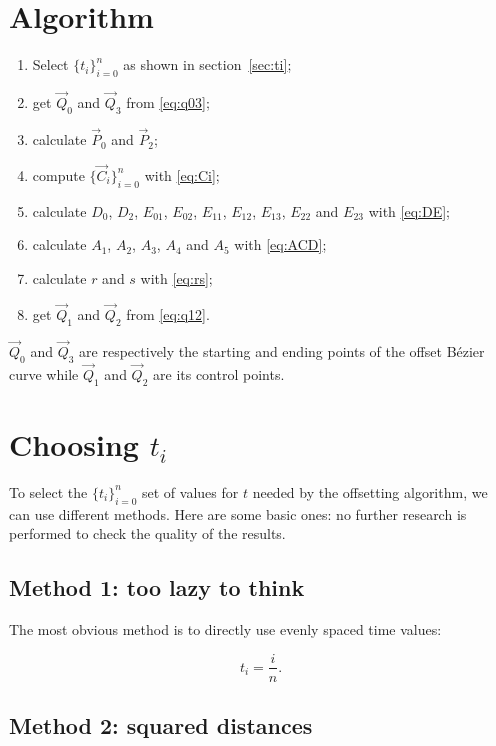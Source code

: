 \documentclass{scrartcl}
\newcommand\V[1]{\vec{#1}}
\begin{document}
\section{Algorithm}

\begin{enumerate}
    \item Select $\{t_i\}_{i=0}^n$ as shown in section~\ref{sec:ti};
    \item get $\V{Q}_0$ and $\V{Q}_3$ from \eqref{eq:q03};
    \item calculate $\V{P}_0$ and $\V{P}_2$;
    \item compute $\{\V{C}_i\}_{i=0}^n$ with \eqref{eq:Ci};
    \item calculate $D_0$, $D_2$, $E_{01}$, $E_{02}$, $E_{11}$,
	$E_{12}$, $E_{13}$, $E_{22}$ and $E_{23}$ with \eqref{eq:DE};
    \item calculate $A_1$, $A_2$, $A_3$, $A_4$ and $A_5$ with
	\eqref{eq:ACD};
    \item calculate $r$ and $s$ with \eqref{eq:rs};
    \item get $\V{Q}_1$ and $\V{Q}_2$ from \eqref{eq:q12}.
\end{enumerate}

$\V{Q}_0$ and $\V{Q}_3$ are respectively the starting and ending
points of the offset Bézier curve while $\V{Q}_1$ and $\V{Q}_2$ are
its control points.

\section{Choosing $t_i$\label{sec:ti}}

To select the $\{t_i\}_{i=0}^n$ set of values for $t$ needed by
the offsetting algorithm, we can use different methods. Here are some
basic ones: no further research is performed to check the quality of
the results.

\subsection{Method 1: too lazy to think}

The most obvious method is to directly use evenly spaced time values:

\begin{equation*}
    t_i = \frac{i}{n}.
\end{equation*}

\subsection{Method 2: squared distances}
\end{document}
